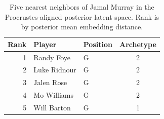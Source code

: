 \begin{table}[htbp]
  \centering\small
  \begin{tabular}{rllc}
    \toprule
    Rank & Player & Position & Archetype \\
    \midrule
    1 & Randy Foye & G & 2 \\
    2 & Luke Ridnour & G & 2 \\
    3 & Jalen Rose & G & 2 \\
    4 & Mo Williams & G & 2 \\
    5 & Will Barton & G & 1 \\
    \bottomrule
  \end{tabular}
  \caption{Five nearest neighbors of Jamal Murray in the Procrustes-aligned posterior latent space. Rank is by posterior mean embedding distance.}
  \label{tab:Jamal_Murray_neighbors}
\end{table}

